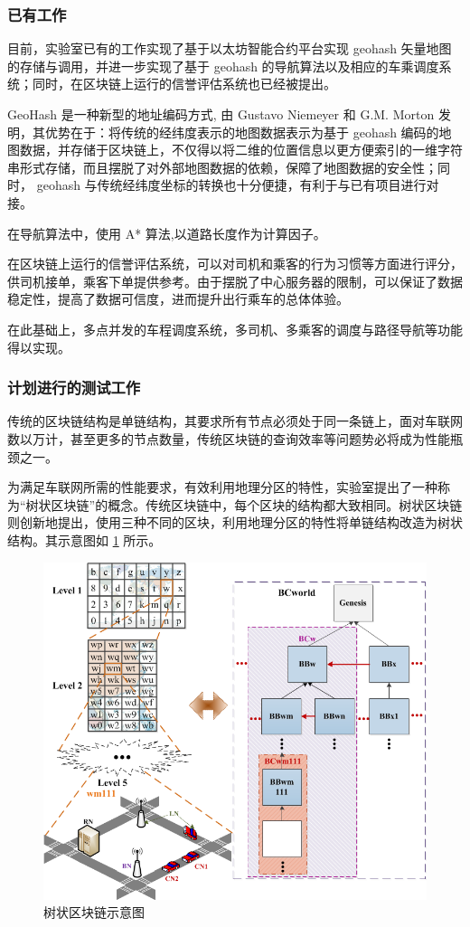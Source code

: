 \documentclass[type=undergraduate_proposal]{bitreport}
\begin{document}
\subsubsection{已有工作}
目前，实验室已有的工作实现了基于以太坊智能合约平台实现 geohash 矢量地图的存储与调用，并进一步实现了基于 geohash 的导航算法以及相应的车乘调度系统；同时，在区块链上运行的信誉评估系统也已经被提出。

GeoHash 是一种新型的地址编码方式, 由 Gustavo Niemeyer 和 G.M. Morton 发明\cite{geohash_intro}，其优势在于：将传统的经纬度表示的地图数据表示为基于 geohash 编码的地图数据，并存储于区块链上，不仅得以将二维的位置信息以更方便索引的一维字符串形式存储，而且摆脱了对外部地图数据的依赖，保障了地图数据的安全性；同时， geohash 与传统经纬度坐标的转换也十分便捷\cite{7160068}，有利于与已有项目进行对接。

在导航算法中，使用 A* 算法\cite{a_star},以道路长度作为计算因子。

在区块链上运行的信誉评估系统，可以对司机和乘客的行为习惯等方面进行评分，供司机接单，乘客下单提供参考。由于摆脱了中心服务器的限制，可以保证了数据稳定性，提高了数据可信度，进而提升出行乘车的总体体验。

在此基础上，多点并发的车程调度系统，多司机、多乘客的调度与路径导航等功能得以实现。

\subsubsection{计划进行的测试工作}
传统的区块链结构是单链结构，其要求所有节点必须处于同一条链上，面对车联网数以万计，甚至更多的节点数量，传统区块链的查询效率等问题势必将成为性能瓶颈之一\cite{limits}。

为满足车联网所需的性能要求，有效利用地理分区的特性，实验室提出了一种称为“树状区块链”的概念\cite{sensors}。传统区块链中，每个区块的结构都大致相同。树状区块链则创新地提出，使用三种不同的区块，利用地理分区的特性将单链结构改造为树状结构。其示意图如 \ref{fig:tree-like-blockchain} 所示。

\begin{figure}[!ht]
  \centering
  \includegraphics[width=0.6\linewidth]{misc/tree-like-blockchain.png}
  \caption{树状区块链示意图}
  \label{fig:tree-like-blockchain}
\end{figure}
\end{document}
